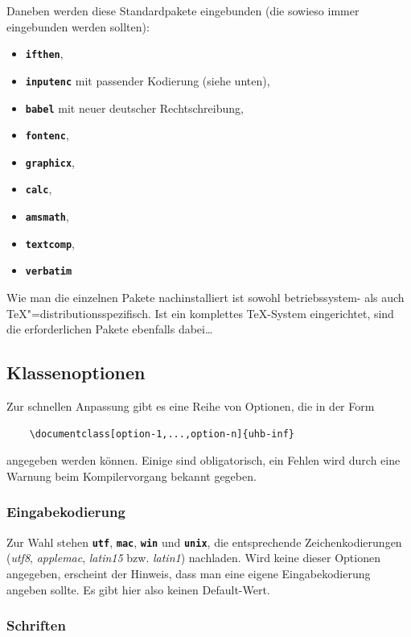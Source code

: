 \documentclass[palatino,gruppe-aus,semester-aus,veranstaltung-aus,abgabe-aus,tutor-aus,utf]{../cls/uhb-inf}
\def\option#1{\texttt{\bfseries #1}}
\begin{document}
Daneben werden diese Standardpakete eingebunden (die sowieso immer eingebunden werden sollten):

\begin{itemize}[noitemsep]
	\item \option{ifthen},
	\item \option{inputenc} mit passender Kodierung (siehe unten),
	\item \option{babel} mit neuer deutscher Rechtschreibung,
	\item \option{fontenc},
	\item \option{graphicx},
	\item \option{calc},
	\item \option{amsmath},
	\item \option{textcomp},
	\item \option{verbatim}
\end{itemize}

Wie man die einzelnen Pakete nachinstalliert ist sowohl betriebssystem- als auch \TeX"=distributionsspezifisch. Ist ein komplettes \TeX-System eingerichtet, sind die erforderlichen Pakete ebenfalls dabei\dots

\subsection{Klassenoptionen}

Zur schnellen Anpassung gibt es eine Reihe von Optionen, die in der Form

\begin{verbatim}
    \documentclass[option-1,...,option-n]{uhb-inf}
\end{verbatim}

angegeben werden können. Einige sind obligatorisch, ein Fehlen wird durch eine Warnung beim Kompilervorgang bekannt gegeben.

\subsubsection{Eingabekodierung}

Zur Wahl stehen \option{utf}, \option{mac}, \option{win} und \option{unix}, die entsprechende Zeichenkodierungen (\textit{utf8}, \textit{applemac}, \textit{latin15} bzw. \textit{latin1}) nachladen. Wird keine dieser Optionen angegeben, erscheint der Hinweis, dass man eine eigene Eingabekodierung angeben sollte. Es gibt hier also keinen Default-Wert.

\subsubsection{Schriften}
\end{document}
